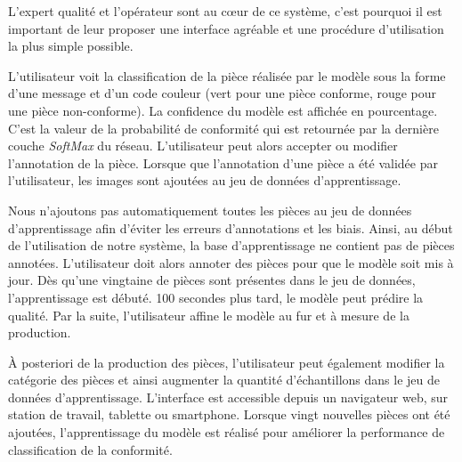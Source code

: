 L’expert qualité et l’opérateur sont au cœur de ce système, c’est pourquoi il est important de leur proposer une interface agréable et une procédure d’utilisation la plus simple possible.

L'utilisateur voit la classification de la pièce réalisée par le modèle sous la forme d'une message et d'un code couleur (vert pour une pièce conforme, rouge pour une pièce non-conforme).
La confidence du modèle est affichée en pourcentage.
C'est la valeur de la probabilité de conformité qui est retournée par la dernière couche \textit{SoftMax} du réseau.
L'utilisateur peut alors accepter ou modifier l'annotation de la pièce.
Lorsque que l'annotation d'une pièce a été validée par l'utilisateur, les images sont ajoutées au jeu de données d'apprentissage.

Nous n'ajoutons pas automatiquement toutes les pièces au jeu de données d'apprentissage afin d'éviter les erreurs d'annotations et les biais.
Ainsi, au début de l'utilisation de notre système, la base d'apprentissage ne contient pas de pièces annotées.
L'utilisateur doit alors annoter des pièces pour que le modèle soit mis à jour.
Dès qu'une vingtaine de pièces sont présentes dans le jeu de données, l'apprentissage est débuté.
100 secondes plus tard, le modèle peut prédire la qualité.
Par la suite, l'utilisateur affine le modèle au fur et à mesure de la production.

À posteriori de la production des pièces, l'utilisateur peut également modifier la catégorie des pièces et ainsi augmenter la quantité d'échantillons dans le jeu de données d'apprentissage.
L'interface est accessible depuis un navigateur web, sur station de travail, tablette ou smartphone.
Lorsque vingt nouvelles pièces ont été ajoutées, l'apprentissage du modèle est réalisé pour améliorer la performance de classification de la conformité.

\bigskip

\bigskip

